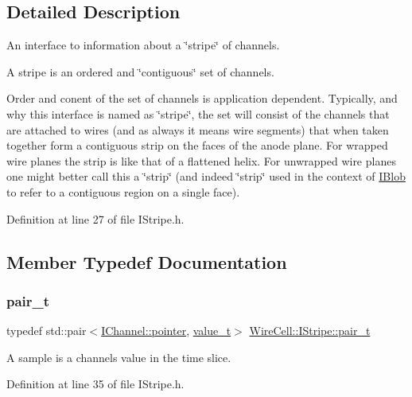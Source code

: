 \subsection{Detailed Description}
An interface to information about a \char`\"{}stripe\char`\"{} of channels.

A stripe is an ordered and \char`\"{}contiguous\char`\"{} set of channels.

Order and conent of the set of channels is application dependent. Typically, and why this interface is named as \char`\"{}stripe\char`\"{}, the set will consist of the channels that are attached to wires (and as always it means wire segments) that when taken together form a contiguous strip on the faces of the anode plane. For wrapped wire planes the strip is like that of a flattened helix. For unwrapped wire planes one might better call this a \char`\"{}strip\char`\"{} (and indeed \char`\"{}strip\char`\"{} used in the context of \hyperlink{class_wire_cell_1_1_i_blob}{I\+Blob} to refer to a contiguous region on a single face). 

Definition at line 27 of file I\+Stripe.\+h.



\subsection{Member Typedef Documentation}
\mbox{\label{class_wire_cell_1_1_i_stripe_a7d2b2bbfd3cd13724a7b7475f1850acd}} 
\subsubsection{\texorpdfstring{pair\+\_\+t}{pair\_t}}
{\footnotesize\ttfamily typedef std\+::pair$<$\hyperlink{class_wire_cell_1_1_i_data_aff870b3ae8333cf9265941eef62498bc}{I\+Channel\+::pointer}, \hyperlink{class_wire_cell_1_1_i_stripe_af0dd73bc2517c2c848c24ea56caefde6}{value\+\_\+t}$>$ \hyperlink{class_wire_cell_1_1_i_stripe_a7d2b2bbfd3cd13724a7b7475f1850acd}{Wire\+Cell\+::\+I\+Stripe\+::pair\+\_\+t}}



A sample is a channel\textquotesingle{}s value in the time slice. 



Definition at line 35 of file I\+Stripe.\+h.

